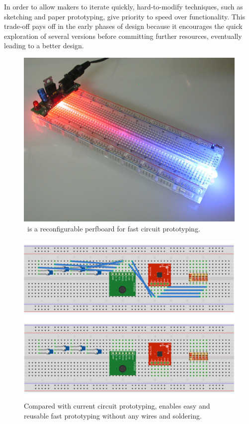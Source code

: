 In order to allow makers to iterate quickly, hard-to-modify techniques, such as sketching and paper prototyping, give priority to speed over functionality. This trade-off pays off in the early phases of design because it encourages the quick exploration of several versions before committing further resources, eventually leading to a better design.
\begin{figure}
  \begin{center}
  \includegraphics[width=1\columnwidth]{figures/Figure1.jpg}
  \caption{\papertitle\ is a reconfigurable perfboard for fast circuit prototyping.}
  \label{fig:FIGURE1}
  \end{center}
\end{figure}
\begin{figure}
  \begin{center}
  \includegraphics[width=1\columnwidth]{figures/current.jpg}
  \caption{Compared with current circuit prototyping, \papertitle enables easy and reusable fast prototyping without any wires and soldering.}
  \label{fig:FIGURE5}
  \end{center}
\end{figure}
